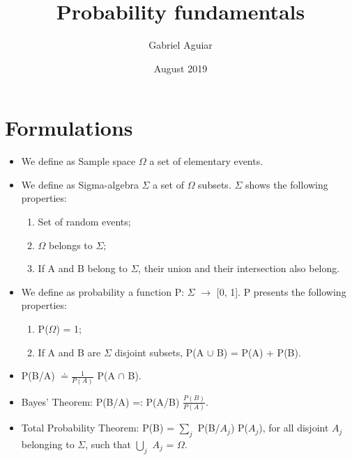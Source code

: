 \documentclass{article}
\title{Probability fundamentals}
\author{Gabriel Aguiar}
\date{August 2019}
\begin{document}
\maketitle

\section{Formulations}

\begin{itemize}
    
\item We define as Sample space $\Omega$ a set of elementary events.

\item We define as Sigma-algebra $\Sigma$ a set of $\Omega$ subsets. $\Sigma$ shows the following properties:

\begin{enumerate}

\item Set of random events;

\item $\Omega$ belongs to $\Sigma$;

\item If A and B belong to $\Sigma$, their union and their intersection also belong.

\end{enumerate}
        
\item We define as probability a function P: $\Sigma$ $\rightarrow$ [0, 1]. P presents the following properties:

\begin{enumerate}

\item P($\Omega$) = 1; 

\item If A and B are $\Sigma$ disjoint subsets, P(A $\cup$ B) = P(A) + P(B).

\end{enumerate}

\item P(B/A) $\doteq \frac{1}{P(A)}$ P(A $\cap$ B).

\item Bayes' Theorem: P(B/A) =: P(A/B) $\frac{P(B)}{P(A)}$.

\item Total Probability Theorem: P(B) = $\sum\limits_{j}$ P(B/$A_{j}$) P($A_{j}$), for all disjoint $A_{j}$ belonging to $\Sigma$, such that $\bigcup\limits_{j}$ $A_{j}$ = $\Omega$.



        
\end{itemize}
\end{document}
